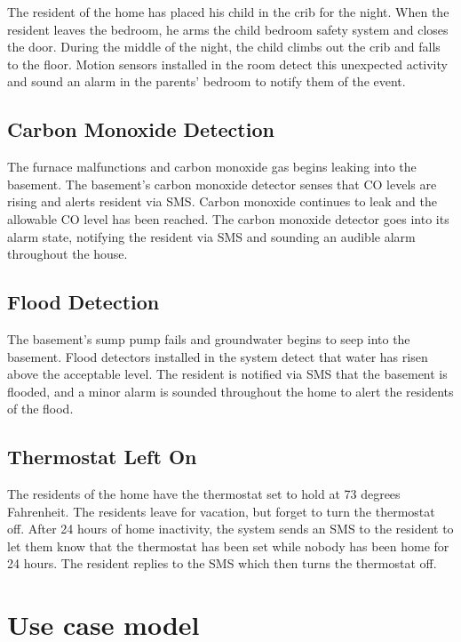 \documentclass{report}
\begin{document}
The resident of the home has placed his child in the crib for the night. When
the resident leaves the bedroom, he arms the child bedroom safety system and
closes the door. During the middle of the night, the child climbs out the crib
and falls to the floor. Motion sensors installed in the room detect this
unexpected activity and sound an alarm in the parents' bedroom to notify them
of the event.

\subsection*{Carbon Monoxide Detection}

The furnace malfunctions and carbon monoxide gas begins leaking into the
basement. The basement's carbon monoxide detector senses that CO levels are
rising and alerts resident via SMS. Carbon monoxide continues to leak and the
allowable CO level has been reached. The carbon monoxide detector goes into its
alarm state, notifying the resident via SMS and sounding an audible alarm
throughout the house.

\subsection*{Flood Detection}

The basement's sump pump fails and groundwater begins to seep into the
basement.  Flood detectors installed in the system detect that water has risen
above the acceptable level. The resident is notified via SMS that the basement
is flooded, and a minor alarm is sounded throughout the home to alert the
residents of the flood.

\subsection*{Thermostat Left On}

The residents of the home have the thermostat set to hold at 73 degrees
Fahrenheit.  The residents leave for vacation, but forget to turn the
thermostat off. After 24 hours of home inactivity, the system sends an SMS to
the resident to let them know that the thermostat has been set while nobody has
been home for 24 hours. The resident replies to the SMS which then turns the
thermostat off.

\section{Use case model}
\end{document}
